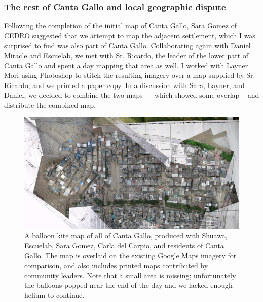 \documentclass[11pt,oneside,notitlepage]{report}
\begin{document}
{{\subsubsection{The rest of Canta Gallo and local geographic dispute}

Following the completion of the initial map of Canta Gallo, Sara Gomez of \ac{CEDRO} suggested that we attempt to map the adjacent settlement, which I was surprised to find was also part of Canta Gallo. Collaborating again with Daniel Miracle and Escuelab, we met with Sr. Ricardo, the leader of the lower part of Canta Gallo and spent a day mapping that area as well. I worked with Layner Mori using Photoshop to stitch the resulting imagery over a map supplied by Sr. Ricardo, and we printed a paper copy. In a discussion with Sara, Layner, and Daniel, we decided to combine the two maps --- which showed some overlap -- and distribute the combined map. 

\begin{figure}[h]
  \begin{center}
	\includegraphics[width=1\textwidth]{images/cantagallo-combined.jpg}
	\caption{A balloon kite map of all of Canta Gallo, produced with Shuawa, Escuelab, Sara Gomez, Carla del Carpio, and residents of Canta Gallo. The map is overlaid on the existing Google Maps imagery for comparison, and also includes printed maps contributed by community leaders. Note that a small area is missing; unfortunately the balloons popped near the end of the day and we lacked enough helium to continue.}
  \end{center}
\end{figure}

}}
\end{document}
